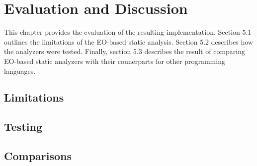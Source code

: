 \chapter{Evaluation and Discussion}
\label{chap:eval}
This chapter provides the evaluation of the resulting implementation. Section 5.1 outlines the limitations of the EO-based static analysis. Section 5.2 describes how the analyzers were tested. Finally, section 5.3 describes the result of comparing EO-based static analyzers with their counerparts for other programming languages.

\section{Limitations}


\section{Testing}

\section{Comparisons}
